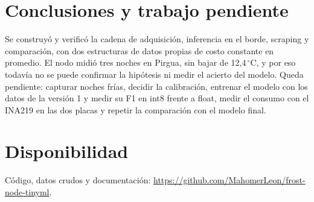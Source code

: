 \documentclass[conference]{IEEEtran}
\begin{document}
\section{Conclusiones y trabajo pendiente}
Se construy\'o y verific\'o la cadena de adquisici\'on, inferencia en el borde, scraping y comparaci\'on, con dos estructuras de datos propias de costo constante en promedio. El nodo midi\'o tres noches en Pirgua, sin bajar de 12,4\,$^\circ$C, y por eso todav\'ia no se puede confirmar la hip\'otesis ni medir el acierto del modelo. Queda pendiente: capturar noches fr\'ias, decidir la calibraci\'on, entrenar el modelo con los datos de la versi\'on 1 y medir su F1 en int8 frente a float, medir el consumo con el INA219 en las dos placas y repetir la comparaci\'on con el modelo final.

\section*{Disponibilidad}
C\'odigo, datos crudos y documentaci\'on: \url{https://github.com/MahomerLeon/frost-node-tinyml}.
\end{document}
